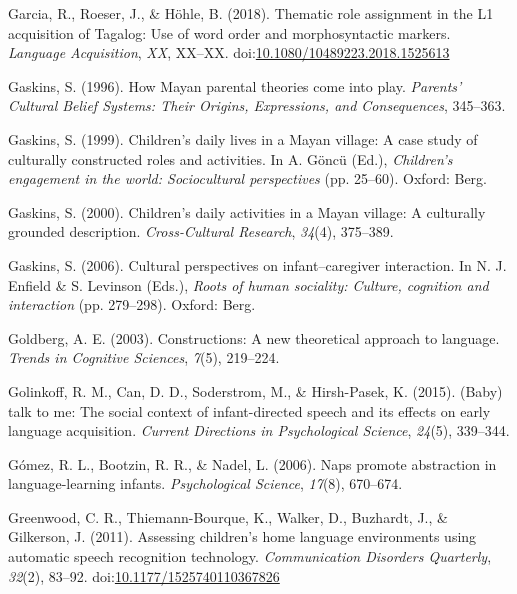 \documentclass[floatsintext,man]{apa6}
\theoremstyle{definition}
\theoremstyle{definition}
\theoremstyle{definition}
\theoremstyle{remark}
\begin{document}
\hypertarget{ref-garcia2018thematic}{}
Garcia, R., Roeser, J., \& Höhle, B. (2018). Thematic role assignment in
the L1 acquisition of Tagalog: Use of word order and morphosyntactic
markers. \emph{Language Acquisition}, \emph{XX}, XX--XX.
doi:\href{https://doi.org/10.1080/10489223.2018.1525613}{10.1080/10489223.2018.1525613}

\hypertarget{ref-gaskins1996how}{}
Gaskins, S. (1996). How Mayan parental theories come into play.
\emph{Parents' Cultural Belief Systems: Their Origins, Expressions, and
Consequences}, 345--363.

\hypertarget{ref-gaskins1999childrens}{}
Gaskins, S. (1999). Children's daily lives in a Mayan village: A case
study of culturally constructed roles and activities. In A. Göncü (Ed.),
\emph{Children's engagement in the world: Sociocultural perspectives}
(pp. 25--60). Oxford: Berg.

\hypertarget{ref-gaskins2000childrens}{}
Gaskins, S. (2000). Children's daily activities in a Mayan village: A
culturally grounded description. \emph{Cross-Cultural Research},
\emph{34}(4), 375--389.

\hypertarget{ref-gaskins2006cultural}{}
Gaskins, S. (2006). Cultural perspectives on infant--caregiver
interaction. In N. J. Enfield \& S. Levinson (Eds.), \emph{Roots of
human sociality: Culture, cognition and interaction} (pp. 279--298).
Oxford: Berg.

\hypertarget{ref-goldberg2003constructions}{}
Goldberg, A. E. (2003). Constructions: A new theoretical approach to
language. \emph{Trends in Cognitive Sciences}, \emph{7}(5), 219--224.

\hypertarget{ref-golinkoff2015baby}{}
Golinkoff, R. M., Can, D. D., Soderstrom, M., \& Hirsh-Pasek, K. (2015).
(Baby) talk to me: The social context of infant-directed speech and its
effects on early language acquisition. \emph{Current Directions in
Psychological Science}, \emph{24}(5), 339--344.

\hypertarget{ref-gomez2006naps}{}
Gómez, R. L., Bootzin, R. R., \& Nadel, L. (2006). Naps promote
abstraction in language-learning infants. \emph{Psychological Science},
\emph{17}(8), 670--674.

\hypertarget{ref-greenwood2011assessing}{}
Greenwood, C. R., Thiemann-Bourque, K., Walker, D., Buzhardt, J., \&
Gilkerson, J. (2011). Assessing children's home language environments
using automatic speech recognition technology. \emph{Communication
Disorders Quarterly}, \emph{32}(2), 83--92.
doi:\href{https://doi.org/10.1177/1525740110367826}{10.1177/1525740110367826}
\end{document}
